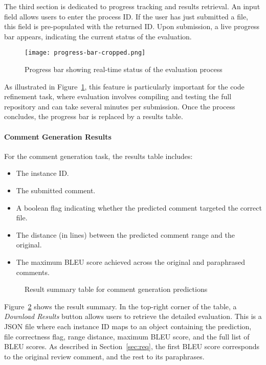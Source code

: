 The third section is dedicated to progress tracking and results retrieval. An input field allows
users to enter the process ID. If the user has just submitted a file, this field is pre-populated
with the returned ID. Upon submission, a live progress bar appears, indicating the current status of
the evaluation.

\begin{figure}[H]
    \centering
    \texttt{[image: progress-bar-cropped.png]}

    \caption{Progress bar showing real-time status of the evaluation process}
    \label{fig:progress-bar}
\end{figure}


As illustrated in Figure~\ref{fig:progress-bar}, this feature is particularly important for the code
refinement task, where evaluation involves compiling and testing the full repository and can take
several minutes per submission. Once the process concludes, the progress bar is replaced by a
results table.

\paragraph{Comment Generation Results}

For the comment generation task, the results table includes:
\begin{itemize}
    \item The instance ID.
    \item The submitted comment.
    \item A boolean flag indicating whether the predicted comment targeted the correct file.
    \item The distance (in lines) between the predicted comment range and the original.
    \item The maximum BLEU score achieved across the original and paraphrased comments.
\end{itemize}

\begin{figure}[H]
    \centering
    \caption{Result summary table for comment generation predictions}
    \label{fig:comment-table}
\end{figure}

Figure~\ref{fig:comment-table} shows the result summary. In the top-right corner of the table, a
\textit{Download Results} button allows users to retrieve the detailed evaluation. This is a JSON
file where each instance ID maps to an object containing the prediction, file correctness flag,
range distance, maximum BLEU score, and the full list of BLEU scores. As described in
Section~\ref{sec:req}, the first BLEU score corresponds to the original review comment, and the rest
to its paraphrases.

